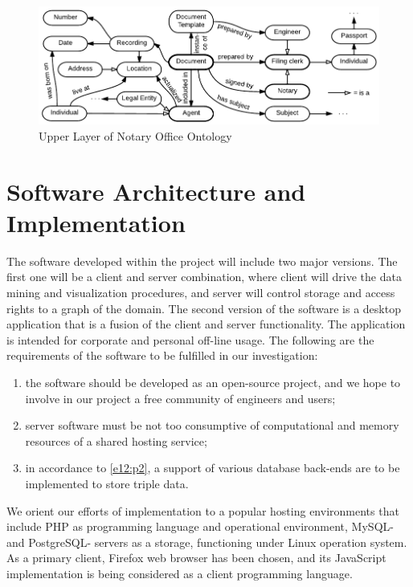 \documentclass[conference]{IEEEtran}
\begin{document}
\begin{figure}[!t]
\centering
\includegraphics[width=\linewidth]{DocumentOntology-en.pdf}
\caption{Upper Layer of Notary Office Ontology}
\label{notaryontology}
\end{figure}

\section{Software Architecture and Implementation}
\label{sec:arch}

The software developed within the project will include two major
versions.  The first one will be a client and server combination,
where client will drive the data mining and visualization procedures,
and server will control storage and access rights to a graph of the
domain.  The second version of the software is a desktop application
that is a fusion of the client and server functionality.  The
application is intended for corporate and personal off-line usage.
The following are the requirements of the software to be fulfilled in
our investigation:
\begin{enumerate}
\item the software should be developed as an open-source project, and
  we hope to involve in our project a free community of engineers and
  users;
\item server software must be not too consumptive of computational and
  memory resources of a shared hosting service; \label{e12:p2}
\item in accordance to \ref{e12:p2}, a support of various database
  back-ends are to be implemented to store triple data.
\end{enumerate}

We orient our efforts of implementation to a popular hosting
environments that include PHP as programming language and operational
environment, MySQL- and PostgreSQL- servers as a storage, functioning
under Linux operation system.  As a primary client, Firefox web
browser has been chosen, and its JavaScript implementation is being
considered as a client programming language.
\end{document}
